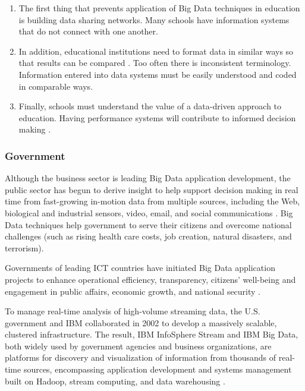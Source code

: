 \documentclass[runningheads]{llncs}
\begin{document}
\begin{enumerate}

\item The first thing that prevents application of Big Data techniques in education is building data sharing networks. Many schools have information systems that do not connect with one another.\\

\item In addition, educational institutions need to format data in similar ways so that results can be compared \cite{EDUCATIONALDM}. Too often there is inconsistent terminology. Information entered into data
systems must be easily understood and coded in comparable ways.\\

\item Finally, schools must understand the value of a data-driven approach to education. Having performance systems will contribute to informed decision making \cite{EDREPORT}.

\end{enumerate}

\subsubsection{Government}

Although the business sector is leading Big Data application development, the public sector has begun to derive insight to help support decision making in real time from fast-growing in-motion data from multiple sources, including the Web, biological and industrial sensors, video, email, and social communications \cite{DOME}. Big Data techniques help government to serve their citizens and overcome national challenges (such as rising health care costs, job creation, natural disasters, and terrorism). 

Governments of leading ICT countries have initiated Big Data application projects to enhance operational efficiency, transparency, citizens' well-being and engagement in public affairs, economic growth, and national security \cite{ACM}.

To manage real-time analysis of high-volume streaming data, the U.S. government and IBM collaborated in 2002 to develop a massively scalable, clustered infrastructure. The result, IBM InfoSphere Stream and IBM Big Data, both widely used by government agencies and business organizations, are platforms for discovery and visualization of information from thousands of real-time sources, encompassing application development and systems management built on Hadoop, stream computing, and data warehousing \cite{ACM}.
\end{document}
